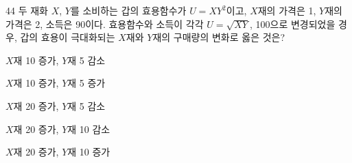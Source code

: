 \begin{question}{44}
두 재화 $X$, $Y$를 소비하는 갑의 효용함수가 $U = XY^2$이고, $X$재의 가격은 1, $Y$재의 가격은 2, 소득은 90이다. 효용함수와 소득이 각각 $U = \sqrt{XY}$, 100으로 변경되었을 경우, 갑의 효용이 극대화되는 $X$재와 $Y$재의 구매량의 변화로 옳은 것은?
\begin{choices}
  \item $X$재 10 증가, $Y$재 5 감소
  \item $X$재 10 증가, $Y$재 5 증가
  \item $X$재 20 증가, $Y$재 5 감소
  \item $X$재 20 증가, $Y$재 10 감소
  \item $X$재 20 증가, $Y$재 10 증가
\end{choices}
\end{question}

